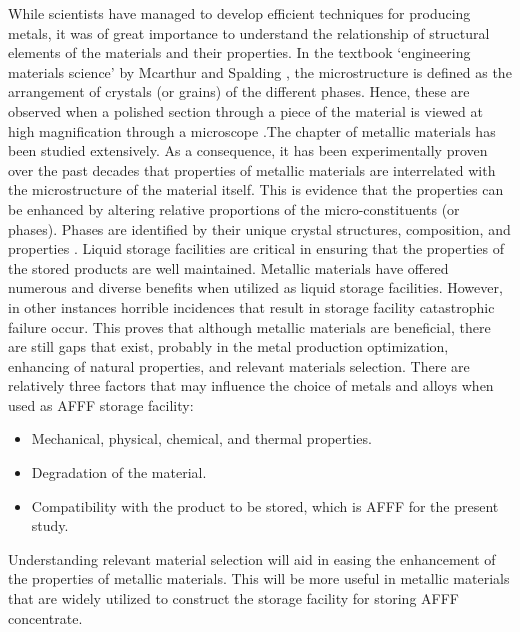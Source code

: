 While scientists have managed to develop efficient techniques for producing metals, it was of great importance to understand the relationship of structural elements of the materials and their properties. In the textbook ‘engineering materials science’ by Mcarthur and Spalding \cite{mcarthur2004engineering}, the microstructure is defined as the arrangement of crystals (or grains) of the different phases. Hence, these are observed when a polished section through a piece of the material is viewed at high magnification through a microscope \cite{molabe2018determining}.The chapter of metallic materials has been studied extensively. As a consequence, it has been experimentally proven over the past decades that properties of metallic materials are interrelated with the microstructure of the material itself. This is evidence that the properties can be enhanced by altering relative proportions of the micro-constituents (or phases). Phases are identified by their unique crystal structures, composition, and properties \cite{mcarthur2004engineering}.
Liquid storage facilities are critical in ensuring that the properties of the stored products are well maintained. Metallic materials have offered numerous and diverse benefits when utilized as liquid storage facilities. However, in other instances horrible incidences that result in storage facility catastrophic failure occur. This proves that although metallic materials are beneficial, there are still gaps that exist, probably in the metal production optimization, enhancing of natural properties, and relevant materials selection. There are relatively three factors that may influence the choice of metals and alloys when used as AFFF storage facility:

\begin{itemize}
    \item Mechanical, physical, chemical, and thermal properties.
    \item Degradation of the material.
    \item Compatibility with the product to be stored, which is AFFF for the present study.
\end{itemize}

Understanding relevant material selection will aid in easing the enhancement of the properties of metallic materials. This will be more useful in metallic materials that are widely utilized to construct the storage facility for storing AFFF concentrate. 

